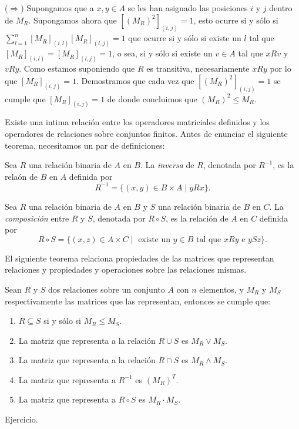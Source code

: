 \begin{teorema}
\begin{demostracion}
\begin{enumerate}
  ($\Rightarrow$) Supongamos que a $x,y\in A$ se les han asignado las posiciones $i$ y $j$ dentro de $M_R$.
  Supongamos ahora que $[(M_R)^2]_{(i,j)}=1$, esto ocurre si y sólo si $\sum_{l=1}^n[M_R]_{(i,l)}[M_R]_{(l,j)}=1$ que ocurre si y sólo si existe un $l$ tal que $[M_R]_{(i,l)}=[M_R]_{(l,j)}=1$, o sea, si y sólo si existe un $v\in A$ tal que $xRv$ y $vRy$.
  Como estamos suponiendo que $R$ es transitiva, necesariamente $xRy$ por lo que $[M_R]_{(i,j)}=1$.
  Demostramos que cada vez que $[(M_R)^2]_{(i,j)}=1$ se cumple que $[M_R]_{(i,j)}=1$ de donde concluimos que $(M_R)^2\leq M_R$.
\end{enumerate}
\end{demostracion}
\end{teorema}

Existe una intima relación entre los operadores matriciales definidos y los operadores de relaciones sobre conjuntos finitos.
Antes de enunciar el siguiente teorema, necesitamos un par de definiciones:

\begin{definicion}
Sea $R$ una relación binaria de $A$ en $B$.
La \emph{inversa} de $R$, denotada por $R^{-1}$, es la relaón de $B$ en $A$ definida por
  $$
  R^{-1}=\{(x,y)\in B\times A\;|\; yRx\}.
  $$

Sea $R$ una relación binaria de $A$ en $B$ y $S$ una 
  relación binaria de $B$ en $C$.
  La \emph{composición} entre $R$ y $S$, denotada por $R\circ S$,
  es la relación de $A$ en $C$ definida por
  $$
  R\circ S=\{(x,z)\in A\times C\;|\;\text{ existe un }y\in B\text{ tal que }xRy\text{ e }ySz\}.
  $$
\end{definicion}

El siguiente teorema relaciona propiedades de las matrices que representan relaciones
y propiedades y operaciones sobre las relaciones mismas.

\begin{teorema}
Sean $R$ y $S$ dos relaciones sobre un conjunto $A$ con $n$ elementos, y $M_R$ y $M_S$ respectivamente las matrices que las representan, entonces se cumple que: \label{teo:operadores-matriz-relacion}
\begin{enumerate}
  \itemsep 0pt
  \item $R\subseteq S$ si y sólo si $M_R\leq M_S$.
  \item La matriz que representa a la relación $R\cup S$ es $M_R\vee M_S$.
  \item La matriz que representa a la relación $R\cap S$ es $M_R\wedge M_S$.
  \item La matriz que representa a $R^{-1}$ es $(M_R)^T$.
  \item La matriz que representa a $R\circ S$ es $M_R\cdot M_S$.
\end{enumerate}
\begin{demostracion} Ejercicio.
\end{demostracion}
\end{teorema}

